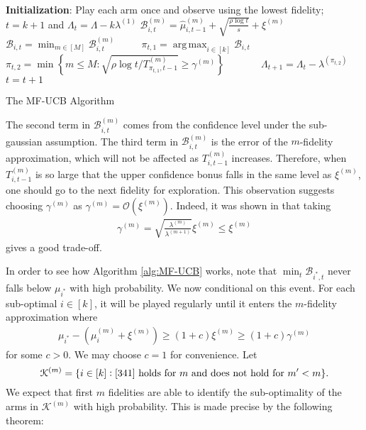 \documentclass[letterpaper,10pt,openright,openany]{book}
\numberwithin{equation}{section}
\theoremstyle{plain}
\theoremstyle{definition}
\DeclareMathOperator*{\argmax}{arg\,max}
\begin{document}
\begin{algorithm}[H]
 \begin{algorithmic}[1]
 \STATE \textbf{Initialization}: Play each arm once and observe using the lowest fidelity; $t=k+1$ and $\Lambda_t = \Lambda - k\lambda^{(1)}$
 \STATE $\mathcal B_{i,t}^{(m)} = \hat{\mu}^{(m)}_{i, t-1}+\sqrt{\frac{\rho\log t}{s}}+\xi^{(m)}$\ \ \ \ \ 
 \ENDFOR
 \STATE $\mathcal B_{i,t} = \min_{m\in [M]}\mathcal B_{i,t}^{(m)}$ \ \ \ \ 
 \ENDFOR
\STATE $\pi_{t,1} = \argmax_{i\in [k]}\mathcal B_{i,t}$
\STATE $\pi_{t,2} = \min\left\{m\leq M: \sqrt{\rho\log t/T^{(m)}_{\pi_{t,1}, t-1}}\geq\gamma^{(m)}\right\}$ \ \ \ \ \ \ 
\STATE $\Lambda_{t+1} = \Lambda_t - \lambda^{(\pi_{t,2})}$
\STATE $t = t+1$
\ENDWHILE
\end{algorithmic}
\caption{The MF-UCB Algorithm} 
\label{alg:MF-UCB}
\end{algorithm}

The second term in $\mathcal B_{i,t}^{(m)}$ comes from the confidence level under the sub-gaussian assumption. The third term in $\mathcal B_{i,t}^{(m)}$ is the error of the $m$-fidelity approximation, which will not be affected as $T^{(m)}_{i, t-1}$ increases. Therefore, when $T^{(m)}_{i, t-1}$ is so large that the upper confidence bonus falls in the same level as $\xi^{(m)}$, one should go to the next fidelity for exploration. This observation suggests choosing $\gamma^{(m)}$ as $\gamma^{(m)}=\mathcal O(\xi^{(m)})$. Indeed, it was shown in \cite{kandasamy2016multi} that taking  
\begin{align*}
\gamma^{(m)} = \sqrt{\frac{\lambda^{(m)}}{\lambda^{(m+1)}}}\xi^{(m)}\leq\xi^{(m)}
\end{align*}
gives a good trade-off. 

In order to see how Algorithm \ref{alg:MF-UCB} works, note that $\min_{t}\mathcal B_{i^*,t}$ never falls below $\mu_{i^*}$ with high probability. We now conditional on this event. For each sub-optimal $i\in [k]$, it will be played regularly until it enters the $m$-fidelity approximation where 
\begin{align}
\mu_{i^*}-(\mu^{(m)}_i+\xi^{(m)})\geq (1+c)\xi^{(m)}\geq (1+c)\gamma^{(m)}\label{341}
\end{align}
for some $c>0$. We may choose $c=1$ for convenience. 
Let $$\mathcal K^{(m)}=\{i\in [k]: \text{\eqref{341} holds for $m$ and does not hold for $m'<m$}\}.$$
We expect that first $m$ fidelities are able to identify the sub-optimality of the arms in $\mathcal K^{(m)}$ with high probability. This is made precise by the following theorem:
\end{document}
